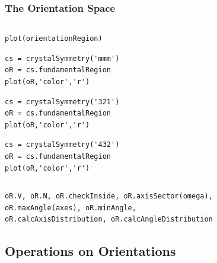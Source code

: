 \documentclass[compress]{beamer}
\begin{document}
\begin{frame}[fragile]
  \frametitle{The Orientation Space}

  \begin{columns}
    \begin{column}{0.55\textwidth}

      \begin{lstlisting}[style=input]
plot(orientationRegion)
      \end{lstlisting}

      \pause

      \vspace{-0.1cm}
      \begin{lstlisting}[style=input]
cs = crystalSymmetry('mmm')
oR = cs.fundamentalRegion
plot(oR,'color','r')
\end{lstlisting}

\pause

\vspace{-0.1cm}
      \begin{lstlisting}[style=input]
cs = crystalSymmetry('321')
oR = cs.fundamentalRegion
plot(oR,'color','r')
\end{lstlisting}

\pause

\vspace{-0.1cm}
      \begin{lstlisting}[style=input]
cs = crystalSymmetry('432')
oR = cs.fundamentalRegion
plot(oR,'color','r')
      \end{lstlisting}

    \end{column}
    \begin{column}{0.45\textwidth}
    \end{column}
  \end{columns}

  \pause

  \begin{lstlisting}[style=input]
oR.V, oR.N, oR.checkInside, oR.axisSector(omega),
oR.maxAngle(axes), oR.minAngle,
oR.calcAxisDistribution, oR.calcAngleDistribution
  \end{lstlisting}


\end{frame}

\subsection*{Operations on Orientations}
\end{document}
